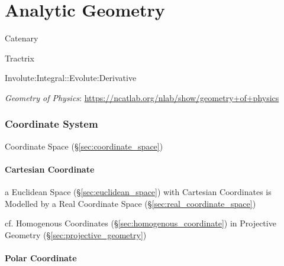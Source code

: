 \part{Analytic Geometry}\label{sec:analytic_geometry}

Catenary

Tractrix

Involute:Integral::Evolute:Derivative


\fist \emph{Geometry of Physics}:
\url{https://ncatlab.org/nlab/show/geometry+of+physics}



\section{Coordinate System}\label{sec:coordinate_system}

Coordinate Space (\S\ref{sec:coordinate_space})



\subsection{Cartesian Coordinate}\label{sec:cartesian_coordinate}

a Euclidean Space (\S\ref{sec:euclidean_space}) with Cartesian
Coordinates is Modelled by a Real Coordinate Space
(\S\ref{sec:real_coordinate_space})

cf. Homogenous Coordinates (\S\ref{sec:homogenous_coordinate}) in
Projective Geometry (\S\ref{sec:projective_geometry})



\subsection{Polar Coordinate}\label{sec:polar_coordinate}

